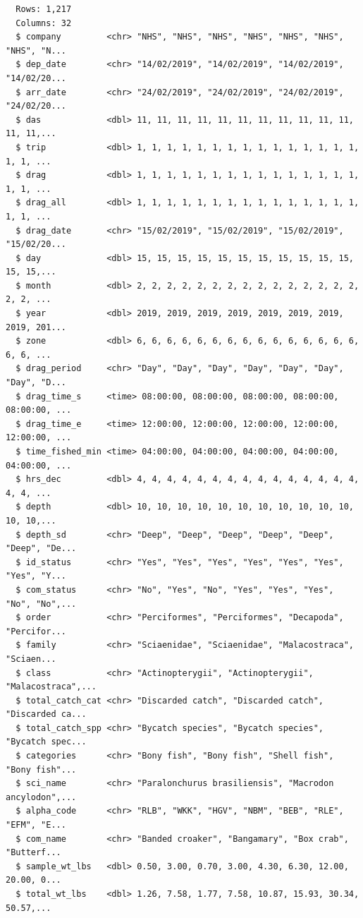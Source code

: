 \documentclass[
]{book}
\newenvironment{Shaded}{\begin{snugshade}}{\end{snugshade}}
\newcommand{\KeywordTok}[1]{\textcolor[rgb]{0.13,0.29,0.53}{\textbf{#1}}}
\newcommand{\NormalTok}[1]{#1}
\newcommand{\OperatorTok}[1]{\textcolor[rgb]{0.81,0.36,0.00}{\textbf{#1}}}
\newcommand{\StringTok}[1]{\textcolor[rgb]{0.31,0.60,0.02}{#1}}
\begin{document}
\begin{Shaded}
\end{Shaded}

\begin{verbatim}
  Rows: 1,217
  Columns: 32
  $ company         <chr> "NHS", "NHS", "NHS", "NHS", "NHS", "NHS", "NHS", "N...
  $ dep_date        <chr> "14/02/2019", "14/02/2019", "14/02/2019", "14/02/20...
  $ arr_date        <chr> "24/02/2019", "24/02/2019", "24/02/2019", "24/02/20...
  $ das             <dbl> 11, 11, 11, 11, 11, 11, 11, 11, 11, 11, 11, 11, 11,...
  $ trip            <dbl> 1, 1, 1, 1, 1, 1, 1, 1, 1, 1, 1, 1, 1, 1, 1, 1, 1, ...
  $ drag            <dbl> 1, 1, 1, 1, 1, 1, 1, 1, 1, 1, 1, 1, 1, 1, 1, 1, 1, ...
  $ drag_all        <dbl> 1, 1, 1, 1, 1, 1, 1, 1, 1, 1, 1, 1, 1, 1, 1, 1, 1, ...
  $ drag_date       <chr> "15/02/2019", "15/02/2019", "15/02/2019", "15/02/20...
  $ day             <dbl> 15, 15, 15, 15, 15, 15, 15, 15, 15, 15, 15, 15, 15,...
  $ month           <dbl> 2, 2, 2, 2, 2, 2, 2, 2, 2, 2, 2, 2, 2, 2, 2, 2, 2, ...
  $ year            <dbl> 2019, 2019, 2019, 2019, 2019, 2019, 2019, 2019, 201...
  $ zone            <dbl> 6, 6, 6, 6, 6, 6, 6, 6, 6, 6, 6, 6, 6, 6, 6, 6, 6, ...
  $ drag_period     <chr> "Day", "Day", "Day", "Day", "Day", "Day", "Day", "D...
  $ drag_time_s     <time> 08:00:00, 08:00:00, 08:00:00, 08:00:00, 08:00:00, ...
  $ drag_time_e     <time> 12:00:00, 12:00:00, 12:00:00, 12:00:00, 12:00:00, ...
  $ time_fished_min <time> 04:00:00, 04:00:00, 04:00:00, 04:00:00, 04:00:00, ...
  $ hrs_dec         <dbl> 4, 4, 4, 4, 4, 4, 4, 4, 4, 4, 4, 4, 4, 4, 4, 4, 4, ...
  $ depth           <dbl> 10, 10, 10, 10, 10, 10, 10, 10, 10, 10, 10, 10, 10,...
  $ depth_sd        <chr> "Deep", "Deep", "Deep", "Deep", "Deep", "Deep", "De...
  $ id_status       <chr> "Yes", "Yes", "Yes", "Yes", "Yes", "Yes", "Yes", "Y...
  $ com_status      <chr> "No", "Yes", "No", "Yes", "Yes", "Yes", "No", "No",...
  $ order           <chr> "Perciformes", "Perciformes", "Decapoda", "Percifor...
  $ family          <chr> "Sciaenidae", "Sciaenidae", "Malacostraca", "Sciaen...
  $ class           <chr> "Actinopterygii", "Actinopterygii", "Malacostraca",...
  $ total_catch_cat <chr> "Discarded catch", "Discarded catch", "Discarded ca...
  $ total_catch_spp <chr> "Bycatch species", "Bycatch species", "Bycatch spec...
  $ categories      <chr> "Bony fish", "Bony fish", "Shell fish", "Bony fish"...
  $ sci_name        <chr> "Paralonchurus brasiliensis", "Macrodon ancylodon",...
  $ alpha_code      <chr> "RLB", "WKK", "HGV", "NBM", "BEB", "RLE", "EFM", "E...
  $ com_name        <chr> "Banded croaker", "Bangamary", "Box crab", "Butterf...
  $ sample_wt_lbs   <dbl> 0.50, 3.00, 0.70, 3.00, 4.30, 6.30, 12.00, 20.00, 0...
  $ total_wt_lbs    <dbl> 1.26, 7.58, 1.77, 7.58, 10.87, 15.93, 30.34, 50.57,...
\end{verbatim}
\end{document}
